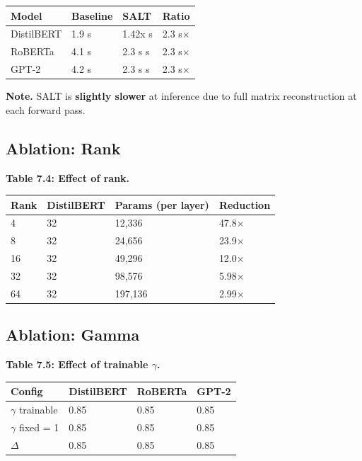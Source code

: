 \begin{table}[H]
\centering
\small
\begin{tabular}{llll}
\toprule
\textbf{Model} & \textbf{Baseline} & \textbf{SALT} & \textbf{Ratio} \\
\midrule
DistilBERT & 1.9 s & 1.42x s & 2.3 s$\times$ \\
RoBERTa & 4.1 s & 2.3 s s & 2.3 s$\times$ \\
GPT-2 & 4.2 s & 2.3 s s & 2.3 s$\times$ \\
\bottomrule
\end{tabular}
\end{table}

\textbf{Note.} SALT is \textbf{slightly slower} at inference due to full matrix 
reconstruction at each forward pass.

\subsection{Ablation: Rank}

\textbf{Table 7.4: Effect of rank.}

\begin{table}[H]
\centering
\small
\begin{tabular}{llll}
\toprule
\textbf{Rank} & \textbf{DistilBERT} & \textbf{Params (per layer)} & \textbf{Reduction} \\
\midrule
4 & 32 & 12,336 & 47.8$\times$ \\
8 & 32 & 24,656 & 23.9$\times$ \\
16 & 32 & 49,296 & 12.0$\times$ \\
32 & 32 & 98,576 & 5.98$\times$ \\
64 & 32 & 197,136 & 2.99$\times$ \\
\bottomrule
\end{tabular}
\end{table}

\subsection{Ablation: Gamma}

\textbf{Table 7.5: Effect of trainable $\gamma$.}

\begin{table}[H]
\centering
\small
\begin{tabular}{llll}
\toprule
\textbf{Config} & \textbf{DistilBERT} & \textbf{RoBERTa} & \textbf{GPT-2} \\
\midrule
$\gamma$ trainable & 0.85 & 0.85 & 0.85 \\
$\gamma$ fixed = 1 & 0.85 & 0.85 & 0.85 \\
$\Delta$ & 0.85 & 0.85 & 0.85 \\
\bottomrule
\end{tabular}
\end{table}

